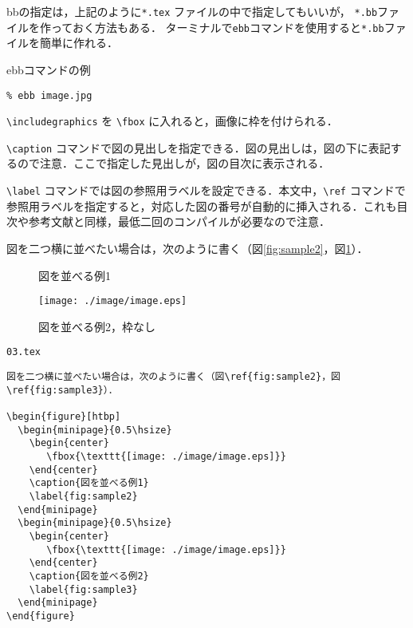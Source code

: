 bbの指定は，上記のように\texttt{*.tex} ファイルの中で指定してもいいが，
\texttt{*.bb}ファイルを作っておく方法もある．
ターミナルで\texttt{ebb}コマンドを使用すると\texttt{*.bb}ファイルを簡単に作れる．


\begin{itembox}[l]{ebbコマンドの例}
\begin{verbatim}
% ebb image.jpg
\end{verbatim}
\end{itembox}


\verb|\includegraphics| を \verb|\fbox| に入れると，画像に枠を付けられる．

\verb|\caption| コマンドで図の見出しを指定できる．図の見出しは，図の下に表記するので注意．ここで指定した見出しが，図の目次に表示される．

\verb|\label| コマンドでは図の参照用ラベルを設定できる．本文中，\verb|\ref| コマンドで参照用ラベルを指定すると，対応した図の番号が自動的に挿入される．これも目次や参考文献と同様，最低二回のコンパイルが必要なので注意．

図を二つ横に並べたい場合は，次のように書く（図\ref{fig:sample2}，図\ref{fig:sample3}）．

\begin{figure}[htbp]
  \begin{minipage}{0.5\hsize}
    \begin{center}
    \end{center}
    \caption{図を並べる例1}
    \label{fig:sample2}
  \end{minipage}
  \begin{minipage}{0.5\hsize}
    \begin{center}
       \texttt{[image: ./image/image.eps]}
    \end{center}
    \caption{図を並べる例2，枠なし}
    \label{fig:sample3}
  \end{minipage}
\end{figure}

\begin{itembox}[l]{\texttt{03.tex}}
\begin{verbatim}
図を二つ横に並べたい場合は，次のように書く（図\ref{fig:sample2}，図\ref{fig:sample3}）．

\begin{figure}[htbp]
  \begin{minipage}{0.5\hsize}
    \begin{center}
       \fbox{\texttt{[image: ./image/image.eps]}}
    \end{center}
    \caption{図を並べる例1}
    \label{fig:sample2}
  \end{minipage}
  \begin{minipage}{0.5\hsize}
    \begin{center}
       \fbox{\texttt{[image: ./image/image.eps]}}
    \end{center}
    \caption{図を並べる例2}
    \label{fig:sample3}
  \end{minipage}
\end{figure}
\end{verbatim}
\end{itembox}


